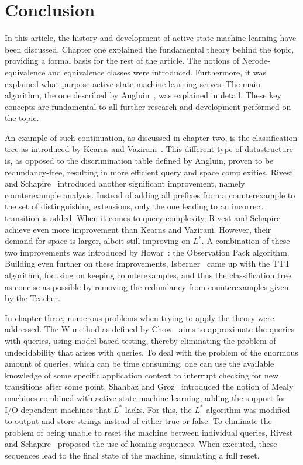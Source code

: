 \documentclass[multi,crop=false,class=article]{standalone}
\begin{document}
\section*{Conclusion}
\label{sec:conclusion}
In this article, the history and development of active state machine learning
have been discussed. Chapter one explained the fundamental theory  behind the
topic, providing a formal basis for the rest of the article. The notions of
Nerode-equivalence and equivalence classes were introduced. Furthermore, it was
explained what purpose active state machine learning serves. The main algorithm,
the one described by Angluin~\cite{Angluin1987}, was explained in detail. These
key concepts are fundamental to all further research and development performed
on the topic.


An example of such continuation, as discussed in chapter two, is
the classification tree as introduced by Kearns and Vazirani~\cite{Kearns1994}.
This different type of datastructure is, as opposed to the discrimination table
defined by Angluin, proven to be redundancy-free, resulting in more efficient
query and space complexities. Rivest and Schapire~\cite{Rivest1993} introduced
another significant improvement, namely counterexample analysis. Instead of
adding all prefixes from a counterexample to the set of distinguishing
extensions, only the one leading to an incorrect transition is added. When it
comes to query complexity, Rivest and Schapire achieve even more improvement
than Kearns and Vazirani. However, their demand for space is larger, albeit
still improving on $L^*$. A combination of these two improvements was introduced
by Howar~\cite{Howar2012a,Isberner2015a}: the Observation Pack algorithm.
Building even further on these improvements, Isberner~\cite{Isberner2014b} came
up with the TTT algorithm, focusing on keeping counterexamples, and thus the
classification tree, as concise as possible by removing the redundancy from
counterexamples given by the Teacher.


In chapter three, numerous problems when
trying to apply the theory were addressed. The W-method as defined by
Chow~\cite{Chow1978} aims to approximate the  queries with  queries,
using model-based testing, thereby eliminating the problem of undecidability
that arises with  queries. To deal with the problem of the enormous amount
of  queries, which can be time consuming, one can use the available
knowledge of some specific application context to interrupt checking for new
transitions after some point. Shahbaz and Groz~\cite{Shahbaz2009}
introduced the notion of Mealy machines combined with active state machine
learning, adding the support for I/O-dependent machines that $L^*$ lacks. For
this, the $L^*$ algorithm was modified to output and store strings instead of
either true or false. To eliminate the problem of being unable to reset the
machine between individual  queries, Rivest and Schapire~\cite{Rivest1993}
proposed the use of homing sequences. When executed, these sequences lead to the
final state of the machine, simulating a full reset.
\end{document}

